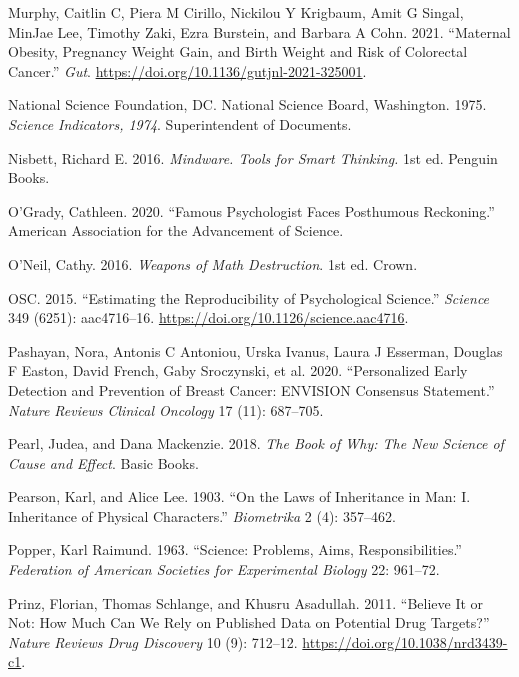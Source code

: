 \documentclass[
  10ptls,
  b5paper]{book}
\newlength{\cslhangindent}
\newenvironment{CSLReferences}[2] %
 {\begin{list}{}{%
  \setlength{\itemindent}{0pt}
  \setlength{\leftmargin}{0pt}
  \setlength{\parsep}{0pt}
  \ifodd #1
   \setlength{\leftmargin}{\cslhangindent}
   \setlength{\itemindent}{-1\cslhangindent}
  \fi
  \setlength{\itemsep}{#2\baselineskip}}}
 {\end{list}}
\begin{document}
\begin{CSLReferences}{1}{0}
Murphy, Caitlin C, Piera M Cirillo, Nickilou Y Krigbaum, Amit G Singal, MinJae Lee, Timothy Zaki, Ezra Burstein, and Barbara A Cohn. 2021. {``Maternal Obesity, Pregnancy Weight Gain, and Birth Weight and Risk of Colorectal Cancer.''} \emph{Gut}. \url{https://doi.org/10.1136/gutjnl-2021-325001}.

National Science Foundation, DC. National Science Board, Washington. 1975. \emph{Science Indicators, 1974}. Superintendent of Documents.

Nisbett, Richard E. 2016. \emph{Mindware. Tools for Smart Thinking.} 1st ed. Penguin Books.

O'Grady, Cathleen. 2020. {``Famous Psychologist Faces Posthumous Reckoning.''} American Association for the Advancement of Science.

O'Neil, Cathy. 2016. \emph{Weapons of Math Destruction}. 1st ed. Crown.

OSC. 2015. {``Estimating the Reproducibility of Psychological Science.''} \emph{Science} 349 (6251): aac4716--16. \url{https://doi.org/10.1126/science.aac4716}.

Pashayan, Nora, Antonis C Antoniou, Urska Ivanus, Laura J Esserman, Douglas F Easton, David French, Gaby Sroczynski, et al. 2020. {``Personalized Early Detection and Prevention of Breast Cancer: ENVISION Consensus Statement.''} \emph{Nature Reviews Clinical Oncology} 17 (11): 687--705.

Pearl, Judea, and Dana Mackenzie. 2018. \emph{The Book of Why: The New Science of Cause and Effect}. Basic Books.

Pearson, Karl, and Alice Lee. 1903. {``On the Laws of Inheritance in Man: I. Inheritance of Physical Characters.''} \emph{Biometrika} 2 (4): 357--462.

Popper, Karl Raimund. 1963. {``Science: Problems, Aims, Responsibilities.''} \emph{Federation of American Societies for Experimental Biology} 22: 961--72.

Prinz, Florian, Thomas Schlange, and Khusru Asadullah. 2011. {``Believe It or Not: How Much Can We Rely on Published Data on Potential Drug Targets?''} \emph{Nature Reviews Drug Discovery} 10 (9): 712--12. \url{https://doi.org/10.1038/nrd3439-c1}.


\end{CSLReferences}
\end{document}
